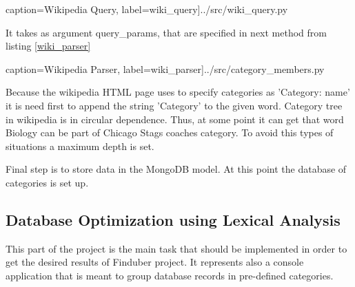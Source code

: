  caption={Wikipedia Query}, label=wiki_query]{../src/wiki_query.py}

It takes as argument query\_params, that are specified in next method from listing \ref{wiki_parser}

 caption={Wikipedia Parser}, label=wiki_parser]{../src/category_members.py}

Because the wikipedia HTML page uses to specify categories as 'Category: name' it is need first to append the string 'Category' to the given word. Category tree in wikipedia is in circular dependence. Thus, at some point it can get that word Biology can be part of Chicago Stags coaches category. To avoid this types of situations a maximum depth is set.

Final step is to store data in the MongoDB model. At this point the database of categories is set up. 

\subsection{Database Optimization using Lexical Analysis}

This part of the project is the main task that should be implemented in order to get the desired results of Finduber project. It represents also a console application that is meant to group database records in pre-defined categories.











